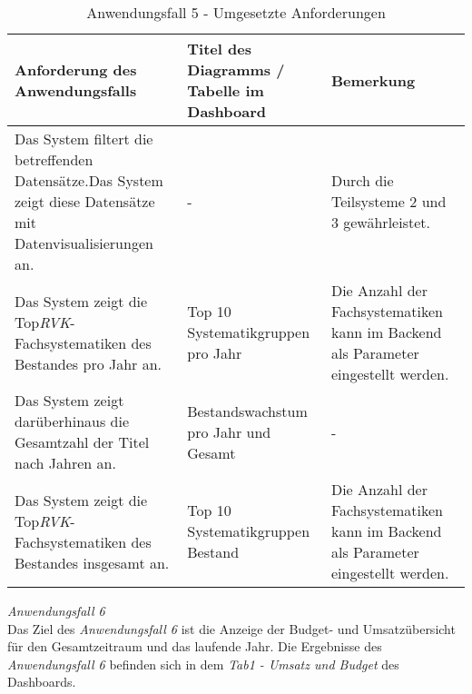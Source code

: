 \begingroup
    \setlength{\tabcolsep}{12pt} %
    \renewcommand{\arraystretch}{1.5} 
    \begin{table}[H]
        \centering
        \begin{adjustbox}{max width=\textwidth}
        \begin{tabular}{p{}p{}p{}}
           \toprule
           Anforderung des Anwendungsfalls        &Titel des Diagramms / Tabelle im Dashboard &Bemerkung\\
           \midrule
           Das System filtert die betreffenden Datensätze.Das System zeigt diese Datensätze mit Datenvisualisierungen an.&-&Durch die Teilsysteme 2 und 3 gewährleistet.\\
           Das System zeigt die Top\textit{\acrshort{RVK}}-Fachsystematiken des Bestandes pro Jahr an.&Top 10 Systematikgruppen pro Jahr&Die Anzahl der Fachsystematiken kann im Backend als Parameter eingestellt werden.\\
           Das System zeigt darüberhinaus die Gesamtzahl der Titel nach Jahren an.&Bestandswachstum pro Jahr und Gesamt&-\\
           Das System zeigt die Top\textit{\acrshort{RVK}}-Fachsystematiken des Bestandes insgesamt an.&Top 10 Systematikgruppen Bestand&Die Anzahl der Fachsystematiken kann im Backend als Parameter eingestellt werden.\\
        \bottomrule
        \end{tabular}
        \end{adjustbox}
        \caption{%
            Anwendungsfall 5 - Umgesetzte Anforderungen
        }
        \label{tab:Anwendungsfall 5 - Umgesetzte Anforderungen}
        \end{table}

\clearpage
\noindent
\textit{Anwendungsfall 6}\\
Das Ziel des \textit{Anwendungsfall 6} ist die Anzeige der Budget- und Umsatzübersicht für den Gesamtzeitraum und das laufende Jahr.
Die Ergebnisse des \textit{Anwendungsfall 6} befinden sich in dem \textit{Tab1 - Umsatz und Budget} des Dashboards.


